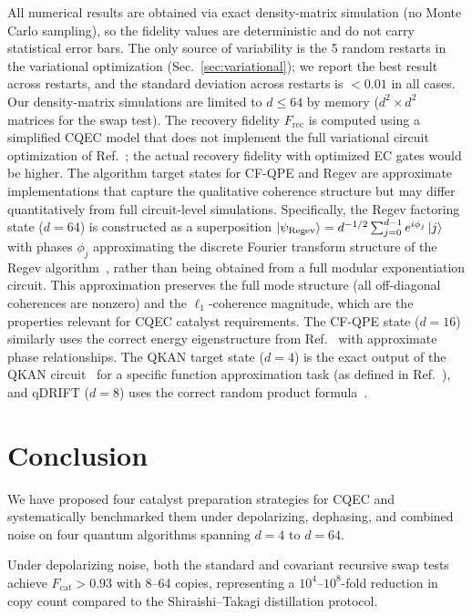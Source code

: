 \documentclass[prx,twocolumn,superscriptaddress,longbibliography,floatfix]{revtex4-2}
\begin{document}
All numerical results are obtained via exact density-matrix simulation (no Monte Carlo sampling), so the fidelity values are deterministic and do not carry statistical error bars.
The only source of variability is the 5 random restarts in the variational optimization (Sec.~\ref{sec:variational}); we report the best result across restarts, and the standard deviation across restarts is $< 0.01$ in all cases.
Our density-matrix simulations are limited to $d \leq 64$ by memory ($d^2 \times d^2$ matrices for the swap test).
The recovery fidelity $F_\mathrm{rec}$ is computed using a simplified CQEC model that does not implement the full variational circuit optimization of Ref.~\cite{Wakaura2026}; the actual recovery fidelity with optimized EC gates would be higher.
The algorithm target states for CF-QPE and Regev are approximate implementations that capture the qualitative coherence structure but may differ quantitatively from full circuit-level simulations.
Specifically, the Regev factoring state ($d = 64$) is constructed as a superposition $\ket{\psi_\mathrm{Regev}} = d^{-1/2}\sum_{j=0}^{d-1} e^{i\phi_j}\ket{j}$ with phases $\phi_j$ approximating the discrete Fourier transform structure of the Regev algorithm~\cite{Regev2024}, rather than being obtained from a full modular exponentiation circuit.
This approximation preserves the full mode structure (all off-diagonal coherences are nonzero) and the $\ell_1$-coherence magnitude, which are the properties relevant for CQEC catalyst requirements.
The CF-QPE state ($d = 16$) similarly uses the correct energy eigenstructure from Ref.~\cite{Clinton2026} with approximate phase relationships.
The QKAN target state ($d = 4$) is the exact output of the QKAN circuit~\cite{Ivashkov2024} for a specific function approximation task (as defined in Ref.~\cite{Wakaura2026}), and qDRIFT ($d = 8$) uses the correct random product formula~\cite{Campbell2019}.


\section{Conclusion}
\label{sec:conclusion}

We have proposed four catalyst preparation strategies for CQEC and systematically benchmarked them under depolarizing, dephasing, and combined noise on four quantum algorithms spanning $d = 4$ to $d = 64$.

Under depolarizing noise, both the standard and covariant recursive swap tests achieve $F_\mathrm{cat} > 0.93$ with 8--64 copies, representing a $10^4$--$10^8$-fold reduction in copy count compared to the Shiraishi--Takagi distillation protocol.
\end{document}
